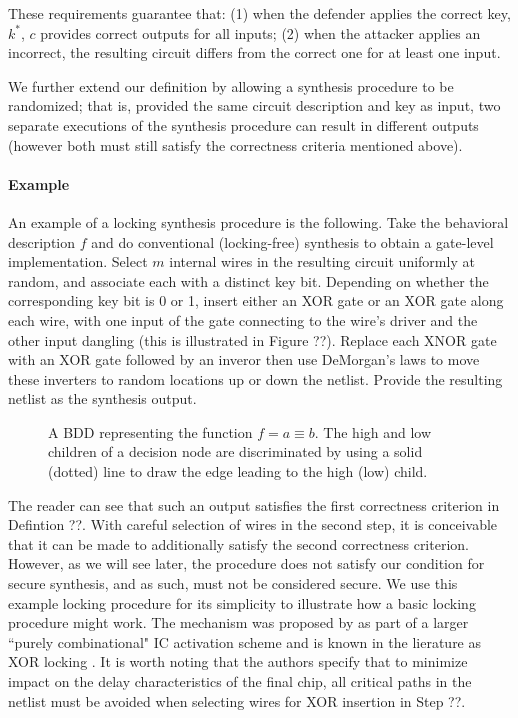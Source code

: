 These requirements guarantee that: (1) when the defender applies the correct key, $k^{*}$,
$c$ provides correct outputs for all inputs; (2) when the attacker applies an incorrect, the resulting circuit differs from the correct one for at least one input.

We further extend our definition by allowing a synthesis procedure to be randomized; that is, provided the same circuit description and key as input, two separate executions of the synthesis procedure can result in different outputs (however both must still satisfy the correctness criteria mentioned above).

\paragraph{Example} An example of a locking synthesis procedure is the following. Take the behavioral description $f$ and do conventional (locking-free) synthesis to obtain a gate-level implementation. Select $m$ internal wires in the resulting circuit uniformly at random, and associate each with a distinct key bit. Depending on whether the corresponding key bit is 0 or 1, insert either an XOR gate or an XOR gate along each wire, with one input of the gate connecting to the wire's driver and the other input dangling (this is illustrated in Figure ??). Replace each XNOR gate with an XOR gate followed by an inveror then use DeMorgan's laws to move these inverters to random locations up or down the netlist. Provide the resulting netlist as the synthesis output.

\newcommand{\dummyfig}[1]{
  \centering
  \fbox{
    \begin{minipage}[c][0.20\textheight][c]{0.45\textwidth}
      \centering{#1}
    \end{minipage}
  }
}

\begin{figure}[h]
  \dummyfig{Dummy Figure Label} 
  \caption{A BDD representing the function $f = a \equiv b$. The high and low children of a decision node are discriminated by using a solid (dotted) line to draw the edge leading to the high (low) child.}
  \label{fig:dummy1}
\end{figure}

The reader can see that such an output satisfies the first correctness criterion in Defintion ??. With careful selection of wires in the second step, it is conceivable that it can be made to additionally satisfy the second correctness criterion. However, as we will see later, the procedure does not satisfy our condition for secure synthesis, and as such, must not be considered secure. We use this example locking procedure for its simplicity to illustrate how a basic locking procedure might work. The mechanism was proposed by \cite{} as part of a larger ``purely combinational" IC activation scheme and is known in the lierature as XOR locking \cite{}. It is worth noting that the authors specify that to minimize impact on the delay characteristics of the final chip, all critical paths in the netlist must be avoided when selecting wires for XOR insertion in Step ??.
